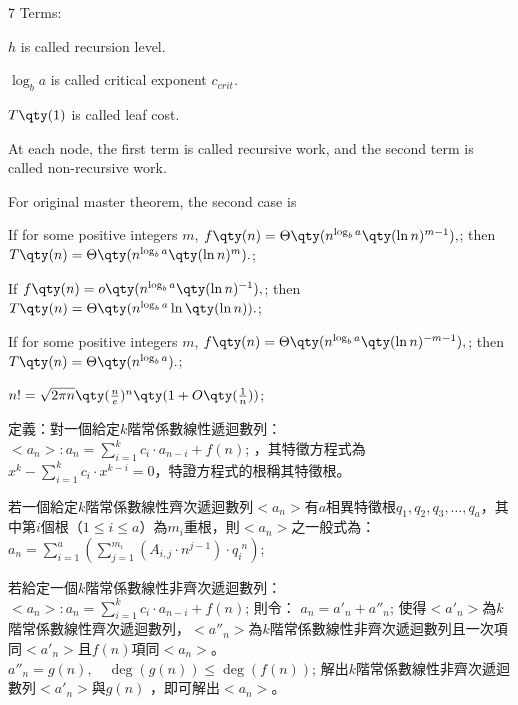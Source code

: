 \documentclass[a4paper,10pt]{extarticle}
\begin{document}
\begin{multicols}{7}
Terms:

$h$ is called recursion level.

$\log_ba$ is called critical exponent $c_{crit}$.

$T\qty(1)$ is called leaf cost.

At each node, the first term is called recursive work, and the second term is called non-recursive work.

For original master theorem, the second case is

If for some positive integers $m$, 
\(f\qty(n)=\Theta\qty(n^{\log_ba}\qty(\ln n)^{m-1}),\); 
then
\(T\qty(n)=\Theta\qty(n^{\log_ba}\qty(\ln n)^m).\); 

If
\(f\qty(n)=o\qty(n^{\log_ba}\qty(\ln n)^{-1}),\); 
then
\(T\qty(n)=\Theta\qty(n^{\log_ba}\ln\qty(\ln n)).\); 

If for some positive integers $m$,
\(f\qty(n)=\Theta\qty(n^{\log_ba}\qty(\ln n)^{-m-1}),\); 
then
\(T\qty(n)=\Theta\qty(n^{\log_ba}).\); 


\(n!=\sqrt{2\pi n}\qty(\frac{n}{e})^n\qty(1+O\qty(\frac{1}{n}))\);


定義：對一個給定$k$階常係數線性遞迴數列：
\(<a_n>: a_n=\sum_{i=1}^k c_i \cdot a_{n-i} + f(n)\); 
，其特徵方程式為$x^k-\sum_{i=1}^k c_i \cdot x^{k-i}=0$，特證方程式的根稱其特徵根。

若一個給定$k$階常係數線性齊次遞迴數列$<a_n>$有$a$相異特徵根$q_1, q_2, q_3, \ldots, q_a$，其中第$i$個根（$1\leq i\leq a$）為$m_i$重根，則$<a_n>$之一般式為：
\(a_n=\sum_{i=1}^{a} \left( \sum_{j=1}^{m_i} \left(A_{i,j}\cdot n^{j-1}\right) \cdot q_i^{\phantom{i}n} \right)\); 

若給定一個$k$階常係數線性非齊次遞迴數列：
\(<a_n>: a_n=\sum_{i=1}^k c_i \cdot a_{n-i} + f(n)\); 
則令：
\(a_n = a'_n+a''_n \); 
使得$<a'_n>$為$k$階常係數線性齊次遞迴數列，$<a''_n>$為$k$階常係數線性非齊次遞迴數列且一次項同$<a'_n>$且$f(n)$項同$<a_n>$。
\(a''_n = g(n),\quad\deg(g(n))\leq \deg(f(n))\); 
解出$k$階常係數線性非齊次遞迴數列$<a'_n>$與$g(n)$ ，即可解出$<a_n>$。



\end{multicols}
\end{document}
